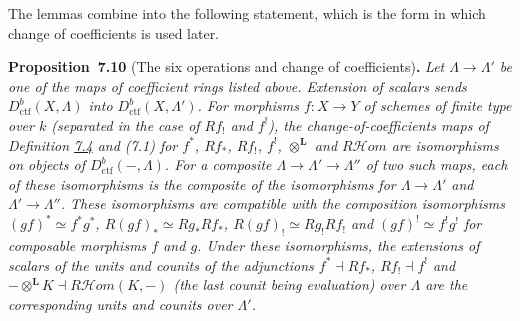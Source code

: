 \documentclass[11pt]{article}
\newenvironment{bpstatement}[2]{\par\addvspace{0.6\baselineskip}\noindent\textbf{#1}#2\textbf{.}\enspace\ignorespaces}
  {\par\addvspace{0.4\baselineskip}}
\newenvironment{bpstatementit}[2]{\begin{bpstatement}{#1}{#2}\itshape\ignorespaces}{\end{bpstatement}}
\providecommand{\cHom}{}\renewcommand{\cHom}{R\mathcal{H}\!om}
\begin{document}
\label{bp25}%
The lemmas combine into the following statement, which is the form in which change of coefficients is used later.

\label{bp26}%
\begin{bpstatementit}{Proposition~7.10}{ (The six operations and change of coefficients)}
Let \(\Lambda\to\Lambda'\) be one of the maps of coefficient rings listed above. Extension of scalars sends \(D^b_{\mathrm{ctf}}(X,\Lambda)\) into \(D^b_{\mathrm{ctf}}(X,\Lambda')\). For morphisms \(f:X\to Y\) of schemes of finite type over \(k\) (separated in the case of \(Rf_!\) and \(f^!\)), the change-of-coefficients maps of Definition \hyperref[bp12]{7.4} and (7.1) for \(f^*\), \(Rf_*\), \(Rf_!\), \(f^!\), \(\otimes^{\mathbf L}\) and \(\cHom\) are isomorphisms on objects of \(D^b_{\mathrm{ctf}}(-,\Lambda)\). For a composite \(\Lambda\to\Lambda'\to\Lambda''\) of two such maps, each of these isomorphisms is the composite of the isomorphisms for \(\Lambda\to\Lambda'\) and \(\Lambda'\to\Lambda''\). These isomorphisms are compatible with the composition isomorphisms \((gf)^*\simeq f^*g^*\), \(R(gf)_*\simeq Rg_*Rf_*\), \(R(gf)_!\simeq Rg_!Rf_!\) and \((gf)^!\simeq f^!g^!\) for composable morphisms \(f\) and \(g\). Under these isomorphisms, the extensions of scalars of the units and counits of the adjunctions \(f^*\dashv Rf_*\), \(Rf_!\dashv f^!\) and \(-\otimes^{\mathbf L}K\dashv\cHom(K,-)\) (the last counit being evaluation) over \(\Lambda\) are the corresponding units and counits over \(\Lambda'\).
\end{bpstatementit}
\end{document}
